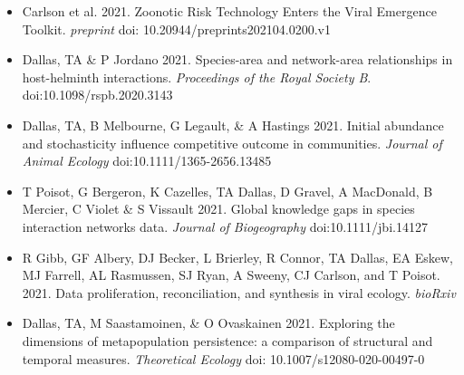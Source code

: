 \documentclass[]{CV}
\begin{document}
\begin{itemize}

\item Carlson et al. 2021. Zoonotic Risk Technology Enters the Viral Emergence Toolkit. \textit{preprint} doi: 10.20944/preprints202104.0200.v1 

\item {\mefont Dallas, TA} \& P Jordano 2021. Species-area and network-area relationships in host-helminth interactions. \textit{Proceedings of the Royal Society B}. doi:10.1098/rspb.2020.3143

\item {\mefont Dallas, TA}, B Melbourne, G Legault, \& A Hastings 2021. Initial abundance and stochasticity influence competitive outcome in communities. \textit{Journal of Animal Ecology} doi:10.1111/1365-2656.13485

\item T Poisot, G Bergeron, K Cazelles, {\mefont TA Dallas}, D Gravel, A MacDonald, B Mercier, C Violet \& S Vissault 2021. Global knowledge gaps in species interaction networks data. \textit{Journal of Biogeography} doi:10.1111/jbi.14127

\item R Gibb, GF Albery, DJ Becker, L Brierley, R Connor, {\mefont TA Dallas}, EA Eskew, MJ Farrell, AL Rasmussen, SJ Ryan, A Sweeny, CJ Carlson, and T Poisot. 2021. Data proliferation, reconciliation, and synthesis in viral ecology. \textit{bioRxiv}

\item {\mefont Dallas, TA}, M Saastamoinen, \& O Ovaskainen 2021. Exploring the dimensions of metapopulation persistence: a comparison of structural and temporal measures. \textit{Theoretical Ecology} doi: 10.1007/s12080-020-00497-0 

\end{itemize}




{}
\end{document}
